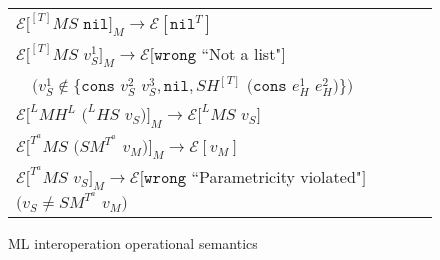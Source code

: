 \begin{figure}[p]
\begin{tabular}{l}
\vspace{5pt}

$\mathscr{E}[^{[T]}MS$ $\mathtt{nil}]_{M}\rightarrow\mathscr{E}[\mathtt{nil}^{T}]$ \\

\vspace{5pt}

$\mathscr{E}[^{[T]}MS$ $v_{S}^{1}]_{M}\rightarrow\mathscr{E}[\mathtt{wrong}$ ``Not a list"$]$ \\

\vspace{5pt}

$\quad(v_{S}^{1}\not\in\lbrace\mathtt{cons}$ $v_{S}^{2}$ $v_{S}^{3},\mathtt{nil},SH^{[T]}$ $(\mathtt{cons}$ $e_{H}^{1}$ $e_{H}^{2})\rbrace)$ \\

\vspace{5pt}

$\mathscr{E}[^{L}MH^{L}$ $(^{L}HS$ $v_{S})]_{M}\rightarrow\mathscr{E}[^{L}MS$ $v_{S}]$ \\

\vspace{5pt}

$\mathscr{E}[^{T^{a}}MS$ $(SM^{T^{a}}$ $v_{M})]_{M}\rightarrow\mathscr{E}[v_{M}]$ \\

\vspace{5pt}

$\mathscr{E}[^{T^{a}}MS$ $v_{S}]_{M}\rightarrow\mathscr{E}[\mathtt{wrong}$ ``Parametricity violated"$]$ $(v_{S}\neq SM^{T^{a}}$ $v_{M})$
\end{tabular}
\caption{ML interoperation operational semantics}
\label{imos}
\end{figure}